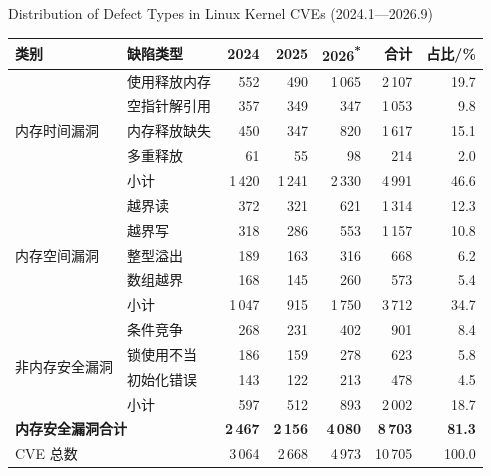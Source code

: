 \begin{table}[!htbp]
    {\enspace Distribution of Defect Types in Linux Kernel CVEs (2024.1—2026.9)}
    \label{tab:1-1}
    \centering
    \scriptsize
    \setlength{\tabcolsep}{5pt}
    \renewcommand{\arraystretch}{1.05}
    \begin{tabular}{llrrrrr}
        \hline
        类别 & 缺陷类型 & 2024 & 2025 & 2026\textsuperscript{*} & 合计 & 占比/\% \\
        \hline
        \multirow{5}{*}{内存时间漏洞}
          & 使用释放内存 & 552 & 490 & 1\,065 & 2\,107 & 19.7 \\
          & 空指针解引用 & 357 & 349 & 347 & 1\,053 & 9.8 \\
          & 内存释放缺失 & 450 & 347 & 820 & 1\,617 & 15.1 \\
          & 多重释放 & 61 & 55 & 98 & 214 & 2.0 \\
        \cline{2-7}
          & 小计 & 1\,420 & 1\,241 & 2\,330 & 4\,991 & 46.6 \\
        \hline
        \multirow{5}{*}{内存空间漏洞}
          & 越界读 & 372 & 321 & 621 & 1\,314 & 12.3 \\
          & 越界写 & 318 & 286 & 553 & 1\,157 & 10.8 \\
          & 整型溢出 & 189 & 163 & 316 & 668 & 6.2 \\
          & 数组越界 & 168 & 145 & 260 & 573 & 5.4 \\
        \cline{2-7}
          & 小计 & 1\,047 & 915 & 1\,750 & 3\,712 & 34.7 \\
        \hline
        \multirow{4}{*}{非内存安全漏洞}
          & 条件竞争 & 268 & 231 & 402 & 901 & 8.4 \\
          & 锁使用不当 & 186 & 159 & 278 & 623 & 5.8 \\
          & 初始化错误 & 143 & 122 & 213 & 478 & 4.5 \\
        \cline{2-7}
          & 小计 & 597 & 512 & 893 & 2\,002 & 18.7 \\
        \hline
        \multicolumn{2}{l}{\textbf{内存安全漏洞合计}} & \textbf{2\,467} & \textbf{2\,156} & \textbf{4\,080} & \textbf{8\,703} & \textbf{81.3} \\
        \multicolumn{2}{l}{CVE 总数} & 3\,064 & 2\,668 & 4\,973 & 10\,705 & 100.0 \\
        \hline
    \end{tabular}
\end{table}

